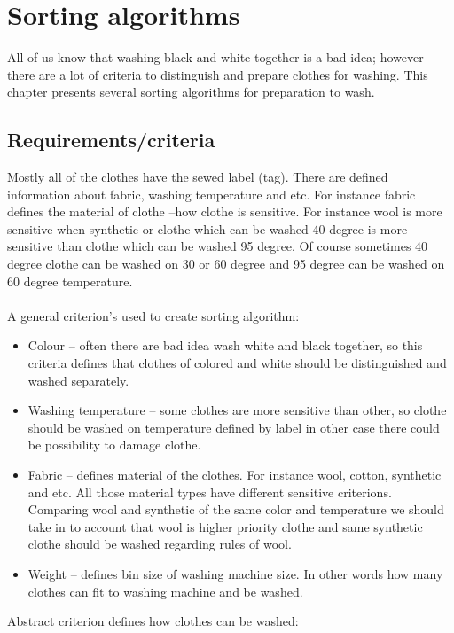 %
\section{Sorting algorithms}

All of us know that washing black and white together is a bad idea; however there are a lot of criteria to distinguish and prepare clothes for washing. This chapter presents several sorting algorithms for preparation to wash. 

\subsection{Requirements/criteria}

Mostly all of the clothes have the sewed label (tag). There are defined information about fabric, washing temperature and etc. For instance fabric defines the material of clothe –how clothe is sensitive.  For instance wool is more sensitive when synthetic or clothe which can be washed 40 degree is more sensitive than clothe which can be washed 95 degree. Of course sometimes 40 degree clothe can be washed on 30 or 60 degree and 95 degree can be washed on 60 degree temperature. \\ \\ A general criterion’s used to create sorting algorithm:

\begin{itemize}
	\item Colour – often there are bad idea wash white and black together, so this criteria defines that clothes of colored and white should be distinguished and washed separately. 
	\item Washing temperature – some clothes are more sensitive than other, so clothe should be washed on temperature defined by label in other case there could be possibility to damage clothe.
	\item Fabric – defines material of the clothes. For instance wool, cotton, synthetic and etc. All those material types have different sensitive criterions. Comparing wool and synthetic of the same color and temperature we should take in to account that wool is higher priority clothe and same synthetic clothe should be washed regarding rules of wool.
	\item Weight – defines bin size of washing machine size. In other words how many clothes can fit to washing machine and be washed.
\end{itemize}

\noindent Abstract criterion defines how clothes can be washed:

